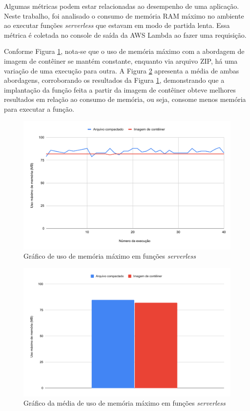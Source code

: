 \documentclass[conference]{IEEEtran}
\begin{document}
Algumas métricas podem estar relacionadas ao desempenho de uma aplicação. Neste trabalho, foi analisado o consumo de memória RAM máximo no ambiente ao executar funções \textit{serverless} que estavam em modo de partida lenta. Essa métrica é coletada no console de saída da AWS Lambda ao fazer uma requisição.

Conforme Figura \ref{graph:functions_max_memory_used}, nota-se que o uso de memória máximo com a abordagem de imagem de contêiner se mantém constante, enquanto via arquivo ZIP, há uma variação de uma execução para outra. A Figura \ref{graph:functions_max_memory_used_average} apresenta a média de ambas abordagens, corroborando os resultados da Figura \mbox{\ref{graph:functions_max_memory_used}}, demonstrando que a implantação da função feita a partir da imagem de contêiner obteve melhores resultados em relação ao consumo de memória, ou seja, consome menos memória para executar a função. 

\begin{figure}[H]
    \centering 
    \includegraphics [width=\linewidth]{images/max-memory-use-PT.pdf}
    \par
    \caption{Gráfico de uso de memória máximo em funções \textit{serverless}}
    \label{graph:functions_max_memory_used}
\end{figure}

\begin{figure}[H]
    \centering 
    \includegraphics [width=\linewidth]{images/max-memory-use-average-PT.pdf}
    \par
    \caption{Gráfico da média de uso de memória máximo em funções \textit{serverless}}
    \label{graph:functions_max_memory_used_average}
\end{figure}
\end{document}
